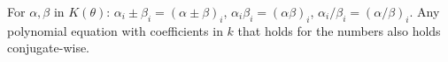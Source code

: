 For $\alpha,\beta$ in $K(\theta)$: $\alpha_i \pm \beta_i = (\alpha \pm \beta)_i$, $\alpha_i\beta_i = (\alpha\beta)_i$, $\alpha_i/\beta_i = (\alpha/\beta)_i$. Any polynomial equation with coefficients in $k$ that holds for the numbers also holds conjugate-wise.
